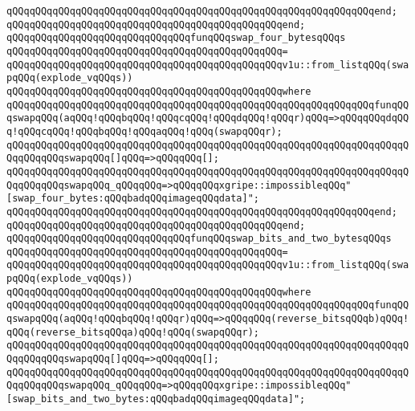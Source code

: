 \verb|qQQqqQQqqQQqqQQqqQQqqQQqqQQqqQQqqQQqqQQqqQQqqQQqqQQqqQQqqQQqqQQqend;|\newline
\verb|qQQqqQQqqQQqqQQqqQQqqQQqqQQqqQQqqQQqqQQqqQQqqQQqend;|\newline
\newline
\verb|qQQqqQQqqQQqqQQqqQQqqQQqqQQqqQQqfunqQQqswap_four_bytesqQQqs|\newline
\verb|qQQqqQQqqQQqqQQqqQQqqQQqqQQqqQQqqQQqqQQqqQQqqQQq=|\newline
\verb|qQQqqQQqqQQqqQQqqQQqqQQqqQQqqQQqqQQqqQQqqQQqqQQqv1u::from_listqQQq(swapqQQq(explode_vqQQqs))|\newline
\verb|qQQqqQQqqQQqqQQqqQQqqQQqqQQqqQQqqQQqqQQqqQQqqQQqwhere|\newline
\verb|qQQqqQQqqQQqqQQqqQQqqQQqqQQqqQQqqQQqqQQqqQQqqQQqqQQqqQQqqQQqqQQqfunqQQqswapqQQq(aqQQq!qQQqbqQQq!qQQqcqQQq!qQQqdqQQq!qQQqr)qQQq=>qQQqqQQqdqQQq!qQQqcqQQq!qQQqbqQQq!qQQqaqQQq!qQQq(swapqQQqr);|\newline
\verb|qQQqqQQqqQQqqQQqqQQqqQQqqQQqqQQqqQQqqQQqqQQqqQQqqQQqqQQqqQQqqQQqqQQqqQQqqQQqqQQqswapqQQq[]qQQq=>qQQqqQQq[];|\newline
\verb|qQQqqQQqqQQqqQQqqQQqqQQqqQQqqQQqqQQqqQQqqQQqqQQqqQQqqQQqqQQqqQQqqQQqqQQqqQQqqQQqswapqQQq_qQQqqQQq=>qQQqqQQqxgripe::impossibleqQQq"[swap_four_bytes:qQQqbadqQQqimageqQQqdata]";|\newline
\verb|qQQqqQQqqQQqqQQqqQQqqQQqqQQqqQQqqQQqqQQqqQQqqQQqqQQqqQQqqQQqqQQqend;|\newline
\verb|qQQqqQQqqQQqqQQqqQQqqQQqqQQqqQQqqQQqqQQqqQQqqQQqend;|\newline
\newline
\verb|qQQqqQQqqQQqqQQqqQQqqQQqqQQqqQQqfunqQQqswap_bits_and_two_bytesqQQqs|\newline
\verb|qQQqqQQqqQQqqQQqqQQqqQQqqQQqqQQqqQQqqQQqqQQqqQQq=|\newline
\verb|qQQqqQQqqQQqqQQqqQQqqQQqqQQqqQQqqQQqqQQqqQQqqQQqv1u::from_listqQQq(swapqQQq(explode_vqQQqs))|\newline
\verb|qQQqqQQqqQQqqQQqqQQqqQQqqQQqqQQqqQQqqQQqqQQqqQQqwhere|\newline
\verb|qQQqqQQqqQQqqQQqqQQqqQQqqQQqqQQqqQQqqQQqqQQqqQQqqQQqqQQqqQQqqQQqfunqQQqswapqQQq(aqQQq!qQQqbqQQq!qQQqr)qQQq=>qQQqqQQq(reverse_bitsqQQqb)qQQq!qQQq(reverse_bitsqQQqa)qQQq!qQQq(swapqQQqr);|\newline
\verb|qQQqqQQqqQQqqQQqqQQqqQQqqQQqqQQqqQQqqQQqqQQqqQQqqQQqqQQqqQQqqQQqqQQqqQQqqQQqqQQqswapqQQq[]qQQq=>qQQqqQQq[];|\newline
\verb|qQQqqQQqqQQqqQQqqQQqqQQqqQQqqQQqqQQqqQQqqQQqqQQqqQQqqQQqqQQqqQQqqQQqqQQqqQQqqQQqswapqQQq_qQQqqQQq=>qQQqqQQqxgripe::impossibleqQQq"[swap_bits_and_two_bytes:qQQqbadqQQqimageqQQqdata]";|\newline
